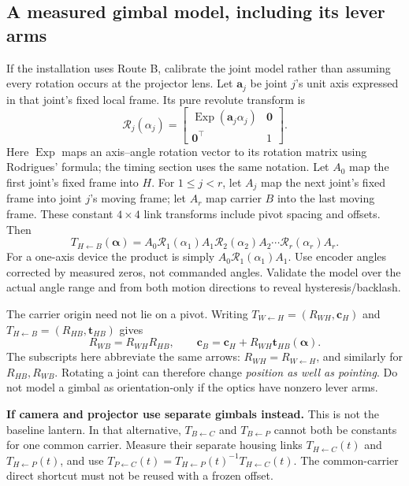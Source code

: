 \documentclass[11pt,a4paper]{article}
\newcommand{\T}[2]{T_{#1\leftarrow #2}}
\newcommand{\Rot}[2]{R_{#1\leftarrow #2}}
\DeclareMathOperator{\Exp}{Exp}
\begin{document}
\subsection{A measured gimbal model, including its lever arms}
If the installation uses Route B, calibrate the joint model rather than
assuming every rotation occurs at the projector lens.
Let $\bm{a}_j$ be joint $j$'s unit axis expressed in that joint's fixed
local frame. Its pure revolute transform is
\begin{equation}
\mathcal R_j(\alpha_j)=
\begin{bmatrix}
\Exp(\bm{a}_j\alpha_j)&\bm{0}\\
\bm{0}^{\top}&1
\end{bmatrix}.
\end{equation}
Here $\Exp$ maps an axis--angle rotation vector to its rotation matrix
using Rodrigues' formula; the timing section uses the same notation.
Let $A_0$ map the first joint's fixed frame into $H$.
For $1\leq j<r$, let $A_j$ map the next joint's fixed frame into joint
$j$'s moving frame; let $A_r$ map carrier $B$ into the last moving frame.
These constant $4\times4$ link transforms include pivot spacing and offsets.
Then
\begin{equation}
\T{H}{B}(\bm{\alpha})=
A_0\mathcal R_1(\alpha_1)A_1
\mathcal R_2(\alpha_2)A_2\cdots
\mathcal R_r(\alpha_r)A_r .
\label{eq:gimbalkinematics}
\end{equation}
For a one-axis device the product is simply
$A_0\mathcal R_1(\alpha_1)A_1$.
Use encoder angles corrected by measured zeros, not commanded angles.
Validate the model over the actual angle range and from both motion
directions to reveal hysteresis/backlash.

The carrier origin need not lie on a pivot.
Writing $\T{W}{H}=(R_{WH},\bm{c}_H)$ and
$\T{H}{B}=(R_{HB},\bm{t}_{HB})$ gives
\begin{equation}
R_{WB}=R_{WH}R_{HB},\qquad
\bm{c}_B=\bm{c}_H+R_{WH}\bm{t}_{HB}(\bm{\alpha}).
\end{equation}
The subscripts here abbreviate the same arrows: $R_{WH}=\Rot{W}{H}$,
and similarly for $R_{HB},R_{WB}$.
Rotating a joint can therefore change \emph{position as well as pointing}.
Do not model a gimbal as orientation-only if the optics have nonzero
lever arms.

\textbf{If camera and projector use separate gimbals instead.}
This is not the baseline lantern. In that alternative,
$\T{B}{C}$ and $\T{B}{P}$ cannot both be constants for one common carrier.
Measure their separate housing links
$\T{H}{C}(t)$ and $\T{H}{P}(t)$, and use
$\T{P}{C}(t)=\T{H}{P}(t)^{-1}\T{H}{C}(t)$.
The common-carrier direct shortcut must not be reused with a frozen offset.
\end{document}
